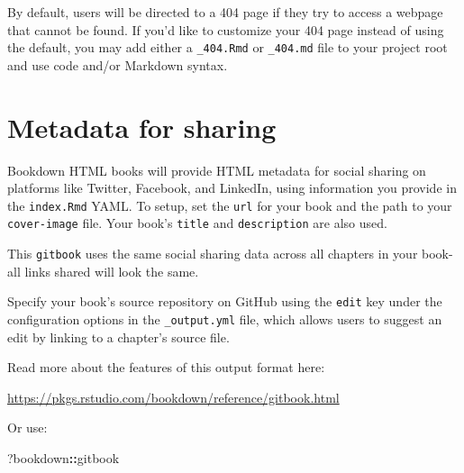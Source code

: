 \documentclass[
  12pt,
  a4paper,
]{book}
\newenvironment{Shaded}{\begin{snugshade}}{\end{snugshade}}
\newcommand{\NormalTok}[1]{#1}
\newcommand{\SpecialCharTok}[1]{\textcolor[rgb]{0.81,0.36,0.00}{\textbf{#1}}}
\theoremstyle{definition}
\theoremstyle{definition}
\theoremstyle{definition}
\theoremstyle{definition}
\theoremstyle{remark}
\begin{document}
By default, users will be directed to a 404 page if they try to access a webpage that cannot be found. If you'd like to customize your 404 page instead of using the default, you may add either a \texttt{\_404.Rmd} or \texttt{\_404.md} file to your project root and use code and/or Markdown syntax.

\section{Metadata for sharing}\label{metadata-for-sharing}

Bookdown HTML books will provide HTML metadata for social sharing on platforms like Twitter, Facebook, and LinkedIn, using information you provide in the \texttt{index.Rmd} YAML. To setup, set the \texttt{url} for your book and the path to your \texttt{cover-image} file. Your book's \texttt{title} and \texttt{description} are also used.

This \texttt{gitbook} uses the same social sharing data across all chapters in your book- all links shared will look the same.

Specify your book's source repository on GitHub using the \texttt{edit} key under the configuration options in the \texttt{\_output.yml} file, which allows users to suggest an edit by linking to a chapter's source file.

Read more about the features of this output format here:

\url{https://pkgs.rstudio.com/bookdown/reference/gitbook.html}

Or use:

\begin{Shaded}
\begin{Highlighting}[]
\NormalTok{?bookdown}\SpecialCharTok{::}\NormalTok{gitbook}
\end{Highlighting}
\end{Shaded}


  
\end{document}
